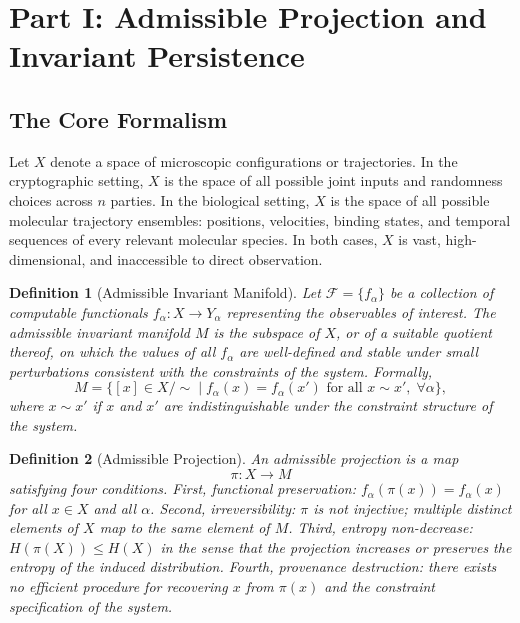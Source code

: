 \documentclass[12pt, a4paper]{article}
\theoremstyle{essaystyle}
\newtheorem{definition}{Definition}
\begin{document}
\section{Part I: Admissible Projection and Invariant Persistence}

\subsection{The Core Formalism}

Let $X$ denote a space of microscopic configurations or trajectories. In the
cryptographic setting, $X$ is the space of all possible joint inputs and randomness
choices across $n$ parties. In the biological setting, $X$ is the space of all possible
molecular trajectory ensembles: positions, velocities, binding states, and temporal
sequences of every relevant molecular species. In both cases, $X$ is vast,
high-dimensional, and inaccessible to direct observation.

\begin{definition}[Admissible Invariant Manifold]
Let $\mathcal{F} = \{f_\alpha\}$ be a collection of computable functionals
$f_\alpha : X \to Y_\alpha$ representing the observables of interest. The
\emph{admissible invariant manifold} $M$ is the subspace of $X$, or of a suitable
quotient thereof, on which the values of all $f_\alpha$ are well-defined and stable
under small perturbations consistent with the constraints of the system. Formally,
\[
M = \bigl\{ [x] \in X/{\sim} \;\big|\; f_\alpha(x) = f_\alpha(x') \text{ for all }
x \sim x',\; \forall \alpha \bigr\},
\]
where $x \sim x'$ if $x$ and $x'$ are indistinguishable under the constraint
structure of the system.
\end{definition}

\begin{definition}[Admissible Projection]
An \emph{admissible projection} is a map
\[
\pi : X \longrightarrow M
\]
satisfying four conditions. First, functional preservation: $f_\alpha(\pi(x)) =
f_\alpha(x)$ for all $x \in X$ and all $\alpha$. Second, irreversibility: $\pi$ is not
injective; multiple distinct elements of $X$ map to the same element of $M$. Third,
entropy non-decrease: $H(\pi(X)) \leq H(X)$ in the sense that the projection increases
or preserves the entropy of the induced distribution. Fourth, provenance destruction:
there exists no efficient procedure for recovering $x$ from $\pi(x)$ and the constraint
specification of the system.
\end{definition}
\end{document}
